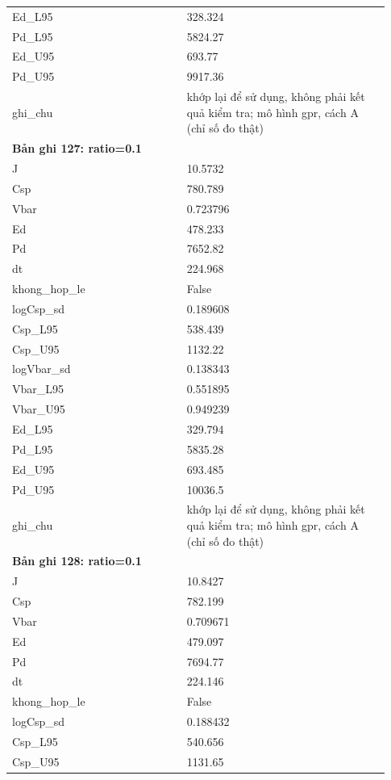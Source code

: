 \begin{longtable}{p{0.43\linewidth}p{0.50\linewidth}}
Ed\_\allowbreak L95 & 328.324 \\
Pd\_\allowbreak L95 & 5824.27 \\
Ed\_\allowbreak U95 & 693.77 \\
Pd\_\allowbreak U95 & 9917.36 \\
ghi\_\allowbreak chu & khớp lại để sử dụng, không phải kết quả kiểm tra; mô hình gpr, cách A (chỉ số đo thật) \\
\midrule
\multicolumn{2}{p{0.95\linewidth}}{\textbf{Bản ghi 127: ratio=0.1}} \\
J & 10.5732 \\
Csp & 780.789 \\
Vbar & 0.723796 \\
Ed & 478.233 \\
Pd & 7652.82 \\
dt & 224.968 \\
khong\_\allowbreak hop\_\allowbreak le & False \\
logCsp\_\allowbreak sd & 0.189608 \\
Csp\_\allowbreak L95 & 538.439 \\
Csp\_\allowbreak U95 & 1132.22 \\
logVbar\_\allowbreak sd & 0.138343 \\
Vbar\_\allowbreak L95 & 0.551895 \\
Vbar\_\allowbreak U95 & 0.949239 \\
Ed\_\allowbreak L95 & 329.794 \\
Pd\_\allowbreak L95 & 5835.28 \\
Ed\_\allowbreak U95 & 693.485 \\
Pd\_\allowbreak U95 & 10036.5 \\
ghi\_\allowbreak chu & khớp lại để sử dụng, không phải kết quả kiểm tra; mô hình gpr, cách A (chỉ số đo thật) \\
\midrule
\multicolumn{2}{p{0.95\linewidth}}{\textbf{Bản ghi 128: ratio=0.1}} \\
J & 10.8427 \\
Csp & 782.199 \\
Vbar & 0.709671 \\
Ed & 479.097 \\
Pd & 7694.77 \\
dt & 224.146 \\
khong\_\allowbreak hop\_\allowbreak le & False \\
logCsp\_\allowbreak sd & 0.188432 \\
Csp\_\allowbreak L95 & 540.656 \\
Csp\_\allowbreak U95 & 1131.65 \\

\end{longtable}
